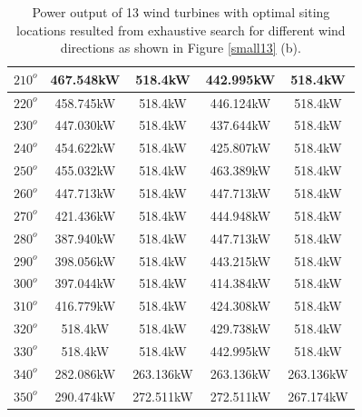 \begin{table}[H]
\begin{tabular}{|c|c|c|c|c|}
        		$210^o$	& 467.548kW	& 518.4kW	& 442.995kW	& 518.4kW	\\ \hline
        		$220^o$	& 458.745kW	& 518.4kW	& 446.124kW	& 518.4kW	\\ \hline
        		$230^o$	& 447.030kW	& 518.4kW	& 437.644kW	& 518.4kW	\\ \hline
        		$240^o$	& 454.622kW	& 518.4kW	& 425.807kW	& 518.4kW	\\ \hline
        		$250^o$	& 455.032kW	& 518.4kW	& 463.389kW	& 518.4kW	\\ \hline
        		$260^o$	& 447.713kW	& 518.4kW	& 447.713kW	& 518.4kW	\\ \hline
        		$270^o$	& 421.436kW	& 518.4kW	& 444.948kW	& 518.4kW	\\ \hline
        		$280^o$	& 387.940kW	& 518.4kW	& 447.713kW	& 518.4kW	\\ \hline
        		$290^o$	& 398.056kW	& 518.4kW	& 443.215kW	& 518.4kW	\\ \hline
        		$300^o$	& 397.044kW	& 518.4kW	& 414.384kW	& 518.4kW	\\ \hline
        		$310^o$	& 416.779kW	& 518.4kW	& 424.308kW	& 518.4kW	\\ \hline
        		$320^o$	& 518.4kW	& 518.4kW	& 429.738kW	& 518.4kW	\\ \hline
        		$330^o$	& 518.4kW	& 518.4kW	& 442.995kW	& 518.4kW	\\ \hline
        		$340^o$	& 282.086kW	& 263.136kW	& 263.136kW	& 263.136kW	\\ \hline
        		$350^o$	& 290.474kW	& 272.511kW	& 272.511kW	& 267.174kW	\\ \hline
        	\end{tabular}
        	\caption{Power output of 13 wind turbines with optimal siting locations resulted from exhaustive search for different wind directions as shown in Figure \ref{small13} (b).}
        	\label{table13b}
        \end{table}
